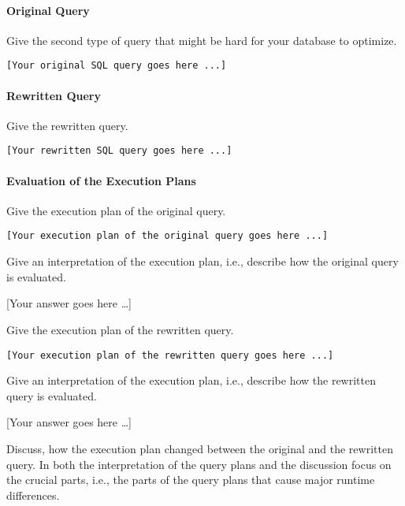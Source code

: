 \documentclass[11pt]{scrartcl}
\newcommand{\youranswerhere}{[Your answer goes here \ldots]}
\begin{document}
\paragraph{Original Query}

Give the second type of query that might be hard for your database to optimize.

\begin{lstlisting}[style=dbtsql]
[Your original SQL query goes here ...]
\end{lstlisting}

\paragraph{Rewritten Query}

Give the rewritten query.

\begin{lstlisting}[style=dbtsql]
[Your rewritten SQL query goes here ...]
\end{lstlisting}

\paragraph{Evaluation of the Execution Plans}

Give the execution plan of the original query.

{\small
\parskip0pt\begin{verbatim}
[Your execution plan of the original query goes here ...]
\end{verbatim}}

Give an interpretation of the execution plan, i.e., describe how the original query is evaluated.

\youranswerhere{}

Give the execution plan of the rewritten query.

{\small
\parskip0pt\begin{verbatim}
[Your execution plan of the rewritten query goes here ...]
\end{verbatim}}

Give an interpretation of the execution plan, i.e., describe how the rewritten query is evaluated.

\youranswerhere{}

Discuss, how the execution plan changed between the original and the rewritten query. In both the interpretation of the query plans and the discussion focus on the crucial parts, i.e., the parts of the query plans that cause major runtime differences.
\end{document}

